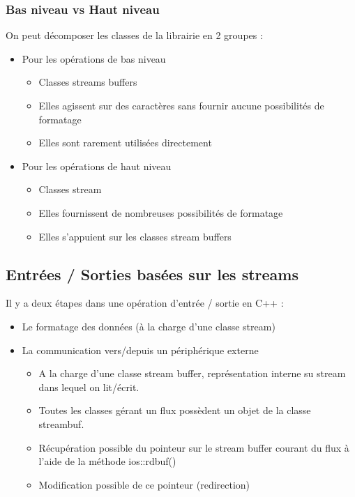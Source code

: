 \documentclass[10pt,a4paper,twoside]{article}
\begin{document}
\subsubsection{Bas niveau vs Haut niveau}
On peut décomposer les classes de la librairie en 2 groupes :
\begin{itemize}
\item Pour les opérations de bas niveau
\begin{itemize}
\item Classes streams buffers
\item Elles agissent sur des caractères sans fournir aucune possibilités de formatage
\item Elles sont rarement utilisées directement
\end{itemize}
\item Pour les opérations de haut niveau
\begin{itemize}
\item Classes stream
\item Elles fournissent de nombreuses possibilités de formatage
\item Elles s'appuient sur les classes stream buffers
\end{itemize}
\end{itemize}

\subsection{Entrées / Sorties basées sur les streams}
Il y a deux étapes dans une opération d'entrée / sortie en C++ :
\begin{itemize}
\item Le formatage des données (à la charge d'une classe stream)
\item La communication vers/depuis un périphérique externe
\begin{itemize}
\item A la charge d'une classe stream buffer, représentation interne su stream dans lequel on lit/écrit.
\item Toutes les classes gérant un flux possèdent un objet de la classe streambuf.
\item Récupération possible du pointeur sur le stream buffer courant du flux à l'aide de la méthode ios::rdbuf()
\item Modification possible de ce pointeur (redirection)
\end{itemize}
\end{itemize}
\end{document}
